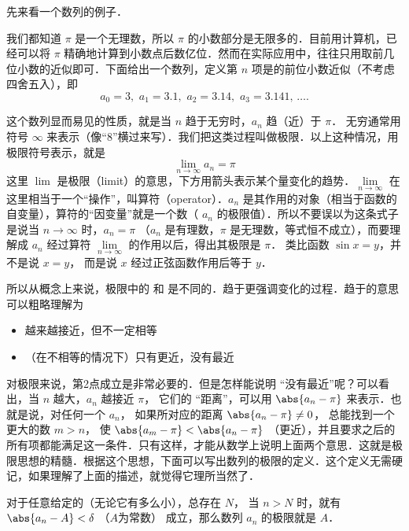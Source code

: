 
先来看一个数列的例子．

\begin{exam}{}
我们都知道 $\pi$ 是一个无理数，所以 $\pi$ 的小数部分是无限多的．目前用计算机，已经可以将 $\pi$ 精确地计算到小数点后数亿位．然而在实际应用中，往往只用取前几位小数的近似即可．下面给出一个数列，定义第 $n$ 项是的前位小数近似（不考虑四舍五入），即
\begin{equation}
a_0 = 3,\,\, a_1 = 3.1,\,\, a_2 = 3.14,\,\, a_3 = 3.141,\,\dots.
\end{equation}
\end{exam}

这个数列显而易见的性质，就是当 $n$ 趋于无穷时，$a_n$ 趋（近）于 $\pi$． 无穷通常用符号 $\infty$ 来表示（像“8”横过来写）．我们把这类过程叫做极限．以上这种情况，用极限符号表示，就是
\begin{equation}
\lim_{n \to \infty } {a_n} = \pi 
\end{equation}
这里 $\lim$ 是极限（limit）的意思，下方用箭头表示某个量变化的趋势．$\lim\limits_{n \to \infty }$ 在这里相当于一个“操作”，叫算符（operator）．$a_n$ 是其作用的对象（相当于函数的自变量），算符的“因变量”就是一个数（ $a_n$ 的极限值）．所以不要误以为这条式子是说当 $n \to \infty$ 时，$a_n=\pi$ （$a_n$ 是有理数，$\pi$ 是无理数，等式恒不成立），而要理解成 $a_n$ 经过算符 $\lim\limits_{n \to \infty }$ 的作用以后，得出其极限是 $\pi$． 类比函数 $\sin x = y$，并不是说 $x=y$， 而是说 $x$ 经过正弦函数作用后等于 $y$． 

所以从概念上来说，极限中的  和  是不同的．趋于更强调变化的过程．趋于的意思可以粗略理解为
\begin{itemize}
\item 越来越接近，但不一定相等
\item （在不相等的情况下）只有更近，没有最近
\end{itemize}

对极限来说，第2点成立是非常必要的．但是怎样能说明 “没有最近”呢？可以看出，当 $n$ 越大，$a_n$ 越接近 $\pi$， 它们的 “距离”，可以用 $\abs{a_n - \pi}$ 来表示．也就是说，对任何一个 $a_n$， 如果所对应的距离 $\abs{a_n - \pi } \ne 0$， 总能找到一个更大的数 $m>n$， 使 $\abs{a_m - \pi} < \abs{a_n - \pi}$ （更近），并且要求之后的所有项都能满足这一条件．只有这样，才能从数学上说明上面两个意思．这就是极限思想的精髓．根据这个思想，下面可以写出数列的极限的定义．这个定义无需硬记，如果理解了上面的描述，就觉得它理所当然了．

对于任意给定的（无论它有多么小），总存在 $N$， 当 $n>N$ 时，就有 $\abs{a_n - A} < \delta $ （$A$为常数） 成立，那么数列 $a_n$ 的极限就是 $A$． 

